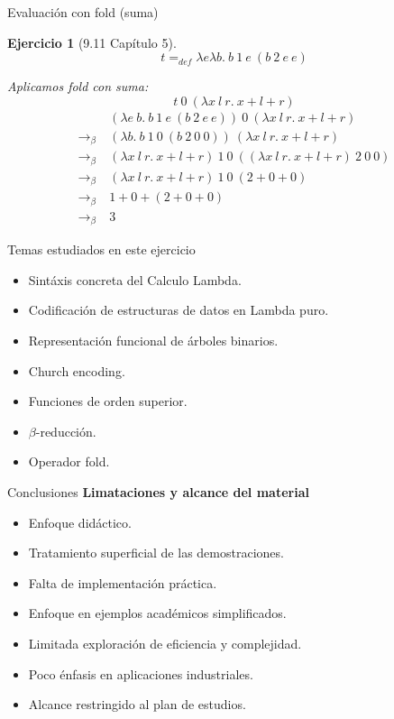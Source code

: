 \documentclass[11pt]{beamer}
\newtheorem{exercise}{Ejercicio}
\begin{document}
\begin{frame}{Evaluación con \textsf{fold} (suma)}
	\begin{exercise}[9.11 Capítulo 5]
		\[
		t =_{def} \lambda e\lambda b.\ b\ 1\ e\ (b\ 2\ e\ e)
		\]
		
		Aplicamos \textsf{fold} con suma:
		\[
		t\ 0\ (\lambda x\ l\ r.\ x + l + r)
		\]
		\begin{align*}
			&(\lambda e\ b.\ b\ 1\ e\ (b\ 2\ e\ e))\ 0\ (\lambda x\ l\ r.\ x + l + r) \\
			\rightarrow_\beta\ &(\lambda b.\ b\ 1\ 0\ (b\ 2\ 0\ 0))\ (\lambda x\ l\ r.\ x + l + r) \\
			\rightarrow_\beta\ &(\lambda x\ l\ r.\ x + l + r)\ 1\ 0\ ((\lambda x\ l\ r.\ x + l + r)\ 2\ 0\ 0) \\
			\rightarrow_\beta\ &(\lambda x\ l\ r.\ x + l + r)\ 1\ 0\ (2 + 0 + 0) \\
			\rightarrow_\beta\ &1 + 0 + (2 + 0 + 0) \\
			\rightarrow_\beta\ &3
		\end{align*}
	\end{exercise}
\end{frame}

\begin{frame}{Temas estudiados en este ejercicio}
	\begin{itemize}
		\item Sintáxis concreta del Calculo Lambda.
		\item Codificación de estructuras de datos en Lambda puro.
		\item Representación funcional de árboles binarios.
		\item Church encoding.
		\item Funciones de orden superior.
		\item $\beta$-reducción.
		\item Operador \textsf{fold}.
		
	\end{itemize}
\end{frame}

\begin{frame}{Conclusiones}
	\textbf{Limataciones y alcance del material} \\[1em]
	\begin{itemize}
		\item Enfoque didáctico.
		\item Tratamiento superficial de las demostraciones.
		\item Falta de implementación práctica.
		\item Enfoque en ejemplos académicos simplificados.
		\item Limitada exploración de eficiencia y complejidad.
		\item Poco énfasis en aplicaciones industriales.
		\item Alcance restringido al plan de estudios.
	\end{itemize}
\end{frame}
\end{document}

